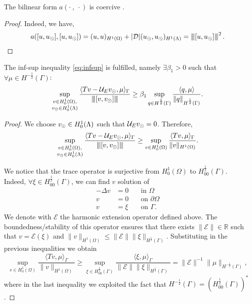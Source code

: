 \begin{lemma}\label{lemma:prob1_coercivity}
The bilinear form $a(\cdot \ , \ \cdot)$ is coercive .
\end{lemma}
\begin{proof}
 Indeed, we have,
\begin{equation*}
a([u,\ud], [u,\ud])= (u,u)_{H^1(\Omega)} + |{\cal D}|(\ud,\ud)_{H^1(\Lambda)} = \vertiii{[u,\ud]}^2\,.
\end{equation*}
\end{proof}
\begin{lemma}
The inf-sup inequality \eqref{eq:infsup} is fulfilled, namely $\exists \beta_1 >0$ such that $\forall \mu \in H^{-\frac 12}(\Gamma)$:
\begin{equation*}
\sup _{\substack{v\in H^1_0(\Omega),\\ v_{\odot} \in H^1_0(\Lambda)}} \frac{ \langle T v  - \mathcal{U}_E v_{\odot}, \mu \rangle_\Gamma}{{\left\vert\kern-0.25ex\left\vert\kern-0.25ex\left\vert [v, v_{\odot}] \right\vert\kern-0.25ex\right\vert\kern-0.25ex\right\vert}}
\geq \beta_1 \sup_{q\in H^{\frac 12}(\Gamma)}\frac{\langle q, \mu\rangle}{\|q\|_{H^{\frac 12}(\Gamma)}}.
\end{equation*}
\end{lemma} 
\begin{proof}
We choose $v_{\odot} \in H^1_0(\Lambda)$ such that $\mathcal{U}_Ev_{\odot} =0$. Therefore,
\begin{equation*}
\sup _{\substack{v\in H^1_0(\Omega),\\ v_{\odot} \in H^1_0(\Lambda)}} \frac{ \langle T v  - \mathcal{U}_E v_{\odot}, \mu\rangle_\Gamma}{{\left\vert\kern-0.25ex\left\vert\kern-0.25ex\left\vert [v, v_{\odot}] \right\vert\kern-0.25ex\right\vert\kern-0.25ex\right\vert}} 
\geq \sup _{v\in H^1_0(\Omega)} \frac{ \langle T v, \mu \rangle_\Gamma}{\|v\|_{H^1(\Omega)}}.
\end{equation*}

We notice that the trace operator is surjective from $H^1_0(\Omega)$ to $H^{\frac12}_{00}(\Gamma)$. Indeed, $\forall \xi \in H^{\frac 12}_{00}(\Gamma)$, we  can find $v$ solution of
\begin{eqnarray*}
-\Delta v&=0 \quad &\text{in }\Omega\\
v&=0 &\text{on }\partial \Omega\\
v&=\xi &\text{on } \Gamma. 
\end{eqnarray*}
We denote with $\mathcal{E}$ the harmonic extension operator defined above.
The boundedness/stability of this operator ensures that there exists $\| \mathcal{E} \| \in \mathbb{R}$ such that
$v=\mathcal{E}(\xi) $ and $\|v \|_{H^1(\Omega)}\leq \|\mathcal{E}\| \|\xi \|_{H^{\frac 12}(\Gamma)}$. 
Substituting in the previous inequalities we obtain
\begin{equation}\label{infsup_traceop}
\sup _{v\in H^1_0(\Omega)} \frac{ \langle T v, \mu \rangle_\Gamma}{\|v\|_{H^1(\Omega)}}
\geq  \sup _{\xi \in H^{\frac 12}_{00}(\Gamma )} \frac{ \langle \xi , \mu \rangle_\Gamma}{\|\mathcal{E}\| \|\xi\|_{H^{\frac 12}(\Gamma)}}
= \|\mathcal{E}\|^{-1} \|\mu\|_{H^{-\frac 12}(\Gamma)},
\end{equation}
where in the last inequality we exploited the fact that $H^{-\frac 12}(\Gamma)=(H^{\frac 12 }_{00}(\Gamma))^*$. 
\end{proof}


